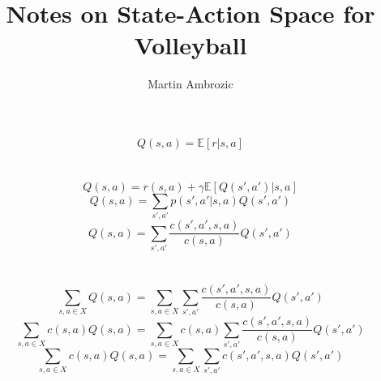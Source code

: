 \documentclass[12pt,letter]{article}
\author{Martin Ambrozic}
\title{Notes on State-Action Space for Volleyball}
\date{}
\begin{document}
	
$$Q(s,a) = \mathbb{E}\left[r|s,a\right]$$\\\\

$$Q(s,a) = r(s,a) + \gamma \mathbb{E}[Q(s',a')|s,a]$$
$$Q(s,a) = \sum_{s',a'} p(s',a'|s,a)Q(s',a')$$
$$Q(s,a) = \sum_{s',a'} \frac{c(s',a',s,a)}{c(s,a)} Q(s',a')$$
\\\\
$$\sum_{s,a\in X} Q(s,a) = \sum_{s,a\in X} \sum_{s',a'} \frac{c(s',a',s,a)}{c(s,a)} Q(s',a')$$
$$\sum_{s,a\in X} c(s,a)Q(s,a) = \sum_{s,a\in X} c(s,a)\sum_{s',a'} \frac{c(s',a',s,a)}{c(s,a)} Q(s',a')$$	
$$\sum_{s,a\in X} c(s,a)Q(s,a) = \sum_{s,a\in X} \sum_{s',a'} c(s',a',s,a) Q(s',a')$$
\end{document}
